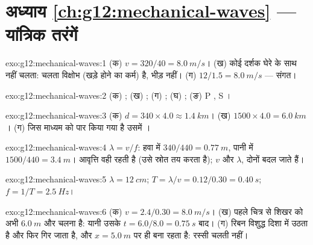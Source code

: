 \section*{अध्याय \ref{ch:g12:mechanical-waves} --- यांत्रिक तरंगें}

\begin{solution}{exo:g12:mechanical-waves:1}
(क) $v = 320/40 = \qty{8.0}{m/s}$। (ख) कोई दर्शक घेरे के साथ नहीं चलता: चलता विक्षोभ (खड़े होने का
कर्म) है, भीड़ नहीं। (ग) $12/1.5 = \qty{8.0}{m/s}$ --- संगत।
\end{solution}

\begin{solution}{exo:g12:mechanical-waves:2}
(क) ; (ख) ; (ग) ;
(घ) ; (ङ) P , S ।
\end{solution}

\begin{solution}{exo:g12:mechanical-waves:3}
(क) $d = 340 \times 4.0 \approx \qty{1.4}{km}$। (ख) $1500 \times 4.0 = \qty{6.0}{km}$। (ग) जिस माध्यम को पार किया गया है उसमें
।
\end{solution}

\begin{solution}{exo:g12:mechanical-waves:4}
$\lambda = v/f$: हवा में $340/440 = \qty{0.77}{m}$, पानी में $1500/440 = \qty{3.4}{m}$। आवृत्ति वही रहती है (उसे
स्रोत तय करता है); $v$ और $\lambda$, दोनों बदल जाते हैं।
\end{solution}

\begin{solution}{exo:g12:mechanical-waves:5}
$\lambda = \qty{12}{cm}$; $T = \lambda/v = 0.12/0.30 = \qty{0.40}{s}$; $f = 1/T = \qty{2.5}{Hz}$।
\end{solution}

\begin{solution}{exo:g12:mechanical-waves:6}
(क) $v = 2.4/0.30 = \qty{8.0}{m/s}$। (ख) पहले चित्र से शिखर को अभी $\qty{6.0}{m}$ और चलना है: यानी उसके
$t = 6.0/8.0 = \qty{0.75}{s}$ बाद। (ग) रिबन विशुद्ध  दिशा में उठता है और फिर गिर जाता है,
और $x = \qty{5.0}{m}$ पर ही बना रहता है: रस्सी चलती नहीं।
\end{solution}

